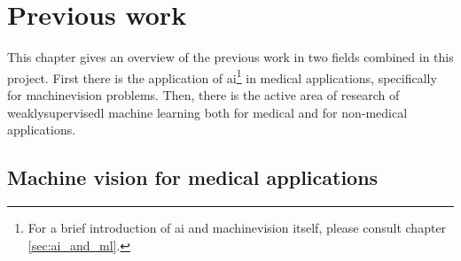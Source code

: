 \chapter{Previous work}\thispagestyle{empty}
\par{
    This chapter gives an overview of the previous work in two fields combined in this project.
    First there is the application of \Gls{ai}\footnote{For a brief introduction of \Gls{ai} and \Gls{machinevision} itself, please consult chapter \ref{sec:ai_and_ml}.} 
    in medical applications, specifically for \Gls{machinevision} problems.
    Then, there is the active area of research of \Gls{weaklysupervisedl} machine learning both for medical and for non-medical applications.
}

\section{Machine vision for medical applications\label{sec:MachineVisionMedical}}

